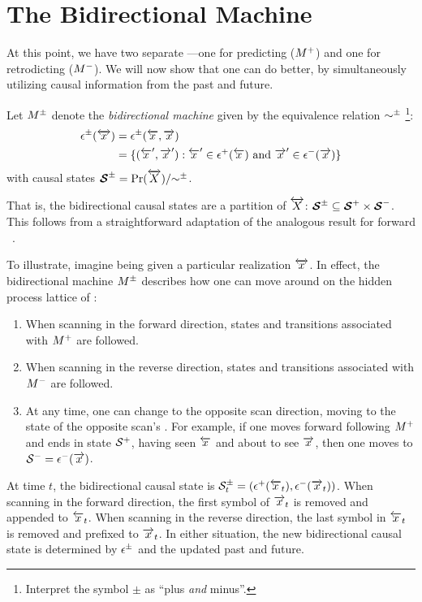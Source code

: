 \section{The Bidirectional Machine}

At this point, we have two separate \eMs---one for predicting (${M}^{+}$) and
one for retrodicting (${M}^{-}$). We will now show that one can do better, 
by simultaneously utilizing causal information from the past and future.

\begin{Def}
Let ${M}^{\pm}$ denote the \emph{bidirectional machine} given by the equivalence
relation ${\sim}^{\pm}$ \footnote{Interpret the symbol $\pm$
as ``plus \emph{and} minus''.}:
\begin{align*}
\epsilon^{\pm}(\overleftrightarrow {{x}}) & = \epsilon^{\pm}({\overleftarrow {{x}}},\overrightarrow{{x}}) \\
  & = \{ ({{\overleftarrow {{x}}}}^{\prime},{\overrightarrow{{x}}}^{\prime}):
  	{{\overleftarrow {{x}}}}^{\prime} \in \epsilon^{+}({\overleftarrow {{x}}}) ~\mathrm{and}~
	{\overrightarrow{{x}}}^{\prime} \in \epsilon^{-}(\overrightarrow{{x}}) \}
\end{align*}
with causal states ${\boldsymbol{\mathcal{S}}}^{\pm} = \Pr(\overleftrightarrow {{X}}) / {\sim}^{\pm}$.
\end{Def}

That is, the bidirectional causal states are a partition of $\overleftrightarrow {{X}}$:
${\boldsymbol{\mathcal{S}}}^{\pm} \subseteq { \boldsymbol{ \mathcal{S} } }^{+} \times { \boldsymbol{ \mathcal{S} } }^{-}$.
This follows from a straightforward adaptation of the analogous result for
forward \eMs~\cite{Crut98d}.

To illustrate, imagine being given a particular realization $\overleftrightarrow {{x}}$. In
effect, the bidirectional machine ${M}^{\pm}$ describes how one can move around on
the hidden process lattice of :
\begin{enumerate}
\item When scanning in the forward direction, states and transitions associated
	with ${M}^{+}$ are followed.
\item When scanning in the reverse direction, states and transitions associated
	with ${M}^{-}$ are followed.
\item At any time, one can change to the opposite scan direction, moving to
	the state of the opposite scan's \eM. For example, if one moves forward
	following ${M}^{+}$
	and ends in state ${\mathcal{S}}^{+}$, having seen ${\overleftarrow {{x}}}$ and about to
	see $\overrightarrow{{x}}$, then one moves to ${\mathcal{S}}^{-} = \epsilon^{-}(\overrightarrow{{x}})$.
\end{enumerate}
At time $t$, the bidirectional causal state is
${\mathcal{S}}^{\pm}_t = (\epsilon^{+}({\overleftarrow {{x}}}_t),\epsilon^{-}(\overrightarrow{{x}}_t))$. When scanning
in the forward direction, the first symbol of $\overrightarrow{{x}}_t$ is removed and
appended to ${\overleftarrow {{x}}}_t$. When scanning in the reverse direction,
the last symbol in ${\overleftarrow {{x}}}_t$ is removed and prefixed to $\overrightarrow{{x}}_t$. In either
situation, the new bidirectional causal state is determined by $\epsilon^{\pm}$ and
the updated past and future.

